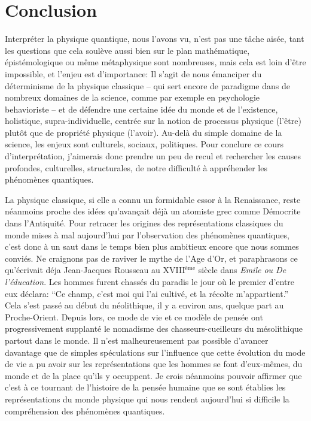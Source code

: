 \part{Conclusion}

Interpréter la physique quantique, nous l'avons vu, n'est pas une tâche aisée,
tant les questions que cela soulève aussi bien sur le plan mathématique,
épistémologique ou même métaphysique sont nombreuses, mais cela est loin d'être impossible, et l'enjeu est d'importance:
Il s'agit de nous émanciper du déterminisme de la physique classique –
qui sert encore de paradigme dans de nombreux domaines de la science, comme par exemple en psychologie behavioriste –
et de défendre une certaine idée du monde et de l'existence, holistique, supra-individuelle,
centrée sur la notion de processus physique (l'être) plutôt que de propriété physique (l'avoir).
Au-delà du simple domaine de la science, les enjeux sont culturels, sociaux, politiques.
Pour conclure ce cours d'interprétation,
j'aimerais donc prendre un peu de recul et rechercher les causes profondes, culturelles, structurales,
de notre difficulté à appréhender les phénomènes quantiques.

La physique classique, si elle a connu un formidable essor à la Renaissance,
reste néanmoins proche des idées qu'avançait déjà un atomiste grec comme Démocrite dans l'Antiquité.
Pour retracer les origines des représentations classiques du monde
mises à mal aujourd'hui par l'observation des phénomènes quantiques,
c'est donc à un saut dans le temps bien plus ambitieux encore que nous sommes conviés.
Ne craignons pas de raviver le mythe de l'Age d'Or,
et paraphrasons ce qu'écrivait déja Jean-Jacques Rousseau au XVIII$^\mathrm{ème}$ siècle dans
\textit{Emile ou De l'éducation}.
Les hommes furent chassés du paradis le jour où le premier d'entre eux déclara:
``Ce champ, c'est moi qui l'ai cultivé, et la récolte m'appartient.''
Cela s'est passé au début du néolithique, il y a environ  ans, quelque part au Proche-Orient.
Depuis lors, ce mode de vie et ce modèle de pensée ont progressivement supplanté le nomadisme des chasseurs-cueilleurs
du mésolithique partout dans le monde.
Il n'est malheureusement pas possible d'avancer davantage que de simples spéculations sur l'influence que cette
évolution du mode de vie a pu avoir sur les représentations que les hommes se font d'eux-mêmes,
du monde et de la place qu'ils y occuppent.
Je crois néanmoins pouvoir affirmer que c'est à ce tournant de l'histoire de la pensée humaine que se sont établies
les représentations du monde physique qui nous rendent aujourd'hui si difficile la compréhension des phénomènes
quantiques.

